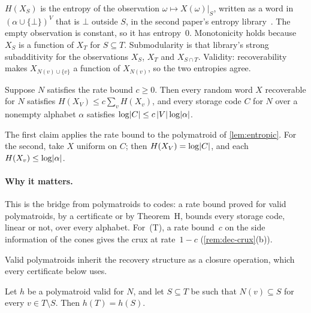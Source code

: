 \begin{outline}
$H(X_S)$ is the entropy of the observation $\omega\mapsto X(\omega)|_S$, written as a word in $(\alpha\cup\{\bot\})^V$ that
is $\bot$ outside $S$, in the second paper's entropy library~\cite{SecondPaper2026}. The empty observation is constant,
so it has entropy~$0$. Monotonicity holds because $X_S$ is a function of $X_T$ for $S\subseteq T$. Submodularity is that
library's strong subadditivity for the observations $X_S$, $X_T$ and $X_{S\cap T}$. Validity: recoverability makes
$X_{N(v)\cup\{v\}}$ a function of $X_{N(v)}$, so the two entropies agree.
\end{outline}

\begin{theorem}\label{thm:entropic-rate}
Suppose $N$ satisfies the rate bound $c\ge0$. Then every random word $X$ recoverable for $N$ satisfies
$H(X_V)\le c\sum_vH(X_v)$, and every storage code $C$ for $N$ over a nonempty alphabet $\alpha$ satisfies
$\log\lvert C \rvert\le c\,\lvert V \rvert\log\lvert \alpha \rvert$.
\end{theorem}

\begin{outline}
The first claim applies the rate bound to the polymatroid of \cref{lem:entropic}. For the second, take $X$ uniform on
$C$; then $H(X_V)=\log\lvert C \rvert$, and each $H(X_v)\le\log\lvert \alpha \rvert$.
\end{outline}

\paragraph{Why it matters.} This is the bridge from polymatroids to codes: a rate bound proved for valid polymatroids,
by a certificate or by Theorem~H, bounds every storage code, linear or not, over every alphabet. For~(T), a rate
bound~$c$ on the side information of the cones gives the crux at rate~$1-c$ (\cref{rem:dec-crux}(b)).

Valid polymatroids inherit the recovery structure as a closure operation, which every certificate below uses.

\begin{lemma}[Closure]\label{lem:closure}
Let $h$ be a polymatroid valid for $N$, and let $S\subseteq T$ be such that $N(v)\subseteq S$ for every
$v\in T\setminus S$. Then $h(T)=h(S)$.
\end{lemma}

